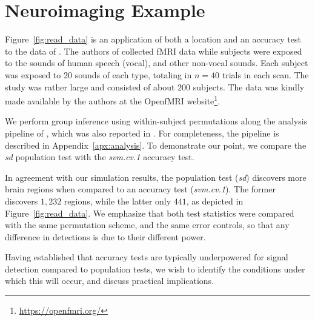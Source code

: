 \documentclass[12pt,a4paper]{article}
\theoremstyle{definition}
\begin{document}
\section{Neuroimaging Example}
\label{sec:example}

Figure~\ref{fig:read_data} is an application of both a location and an accuracy test to the data of \cite{pernet_human_2015}. 
The authors of \cite{pernet_human_2015} collected fMRI data while subjects were exposed to the sounds of human speech (vocal), and other non-vocal sounds. 
Each subject was exposed to $20$ sounds of each type, totaling in $n=40$ trials in each scan.
The study was rather large and consisted of about $200$ subjects.
The data was kindly made available by the authors at the OpenfMRI website\footnote{\url{https://openfmri.org/}}.

We perform group inference using within-subject permutations along the analysis pipeline of \cite{stelzer_statistical_2013}, which was also reported in \cite{gilron_quantifying_2016}. 
For completeness, the pipeline is described in Appendix~\ref{apx:analysis}. 
To demonstrate our point, we compare the \emph{sd} population test with the \emph{svm.cv.1} accuracy test. 

In agreement with our simulation results, the population test (\emph{sd}) discovers more brain regions when compared to an accuracy test (\emph{svm.cv.1}).
The former discovers $1,232$ regions, while the latter only $441$, as depicted in Figure~\ref{fig:read_data}.
We emphasize that both test statistics were compared with the same permutation scheme, and the same error controls, so that any difference in detections is due to their different power.

Having established that accuracy tests are typically underpowered for signal detection compared to population tests, we wish to identify the conditions under which this will occur, and discuss practical implications. 
\end{document}
